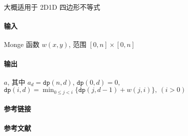 大概适用于 2D1D 四边形不等式

\paragraph{输入} Monge 函数 \(w(x,y)\), 范围 \([0,n]\times[0,n]\)

\paragraph{输出} \(a\), 其中 \(a_d=\texttt{dp}(n,d)\), \(\texttt{dp}(0,d)=0\), \(\texttt{dp}(i,d)=\min_{0\leq j<i}\{\texttt{dp}(j,d-1)+w(j,i)\},~(i>0)\)

\paragraph{参考链接}  

\paragraph{参考文献} \cite{larmore1991line}